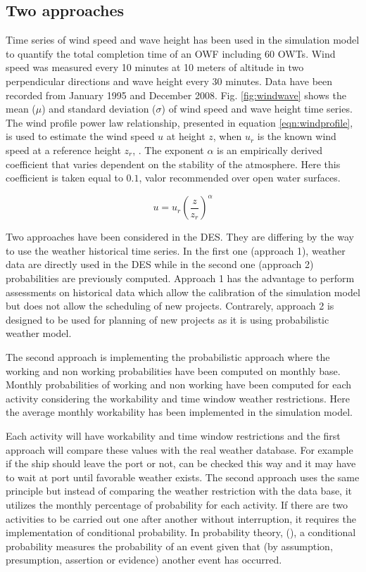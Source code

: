 \subsection{Two approaches}
Time series of wind speed and wave height has been used in the simulation model to quantify the total completion time of an OWF including 60 OWTs. Wind speed was measured every 10 minutes at 10 meters of altitude in two perpendicular directions and wave height every 30 minutes. Data have been recorded from January 1995 and December 2008.
Fig. \ref{fig:windwave} shows the mean ($\mu$) and standard deviation ($\sigma$) of wind speed and wave height time series.
The wind profile power law relationship, presented in equation \ref{eqn:windprofile}, is used to estimate the wind speed $u$ at height $z$, when $u_{r}$ is the known wind speed at a reference height $z_{r}$, \cite{1978Peterson}. The exponent $\alpha$ is an empirically derived coefficient that varies dependent on the stability of the atmosphere. Here this coefficient is taken equal to $0.1$, valor recommended over open water surfaces.

\begin{equation}
\label{eqn:windprofile}
u = u_{r} \left( \frac{z}{z_r} \right)^{\alpha}
\end{equation}

Two approaches have been considered in the DES. They are differing by the way to use the weather historical time series. In the first one (approach 1), weather data are directly used in the DES while in the second one (approach 2) probabilities are previously computed. Approach 1 has the advantage to perform assessments on historical data which allow the calibration of the simulation model but does not allow the scheduling of new projects. Contrarely, approach 2 is designed to be used for planning of new projects as it is using probabilistic weather model.


The second approach is implementing the probabilistic approach where the working and non working probabilities have been computed on monthly base. Monthly probabilities of working and non working have been computed for each activity considering the workability and time window weather restrictions. Here the average monthly workability has been implemented in the simulation model. 

Each activity will have workability and time window restrictions and the first approach will compare these values with the real weather database. For example if the ship should leave the port or not, can be checked this way and it may have to wait at port until favorable weather exists. The second approach uses the same principle but instead of comparing the weather restriction with the data base, it utilizes the monthly percentage of probability for each activity. If there are two activities to be carried out one after another without interruption, it requires the implementation of conditional probability.  
In probability theory, (\cite{Thalemann2012}), a conditional probability measures the probability of an event given that (by assumption, presumption, assertion or evidence) another event has occurred. 

